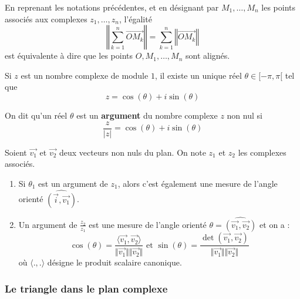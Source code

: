 	\begin{remark}
		En reprenant les notations précédentes, et en désignant par $M_1, \dots, M_n$ les points associés aux complexes $z_1, \dots, z_n$, l'égalité
		\[ \left\Vert \sum_{k=1}^n \overrightarrow{OM_k} \right\Vert = \sum_{k=1}^n \left\Vert \overrightarrow{OM_k} \right\Vert \]
		est équivalente à dire que les points $O, M_1, \dots, M_n$ sont alignés.
	\end{remark}
	
	\begin{theorem}
		Si $z$ est un nombre complexe de module $1$, il existe un unique réel $\theta \in [-\pi, \pi[$ tel que
		\[ z = \cos(\theta) + i\sin(\theta) \]
	\end{theorem}
	
	\begin{definition}
		On dit qu'un réel $\theta$ est un \textbf{argument} du nombre complexe $z$ non nul si
		\[ \frac{z}{\vert z \vert} = \cos(\theta) + i\sin(\theta) \]
	\end{definition}
	
	\begin{theorem}
		Soient $\overrightarrow{v_1}$ et $\overrightarrow{v_2}$ deux vecteurs non nuls du plan. On note $z_1$ et $z_2$ les complexes associés.
		\begin{enumerate}[label=(\roman*)]
			\item Si $\theta_1$ est un argument de $z_1$, alors c'est également une mesure de l'angle orienté $\widehat{(\overrightarrow{i}, \overrightarrow{v_1})}$.
			\item Un argument de $\frac{z_2}{z_1}$ est une mesure de l'angle orienté $\theta = \widehat{(\overrightarrow{v_1}, \overrightarrow{v_2})}$ et on a :
			\[ \cos(\theta) = \frac{\langle \overrightarrow{v_1}, \overrightarrow{v_2} \rangle}{\Vert \overrightarrow{v_1} \Vert \Vert \overrightarrow{v_2} \Vert} \text{ et } \sin(\theta) = \frac{\det \left( \overrightarrow{v_1}, \overrightarrow{v_2} \right)}{\Vert \overrightarrow{v_1} \Vert \Vert \overrightarrow{v_2} \Vert} \]
			où $\langle ., . \rangle$ désigne le produit scalaire canonique.
		\end{enumerate}
	\end{theorem}
	
	\subsubsection{Le triangle dans le plan complexe}
	
	
